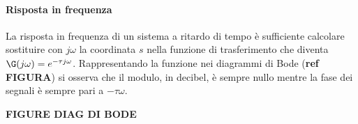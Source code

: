 	\paragraph{Risposta in frequenza} La risposta in frequenza di un sistema a ritardo di tempo è sufficiente calcolare sostituire con $j\omega$ la coordinata $s$ nella funzione di trasferimento che diventa $\G(j\omega) = e^{-\tau j\omega}$. Rappresentando la funzione nei diagrammi di Bode (\textbf{ref FIGURA}) si osserva che il modulo, in decibel, è sempre nullo mentre la fase dei segnali è sempre pari a $-\tau \omega$.
	
	\textbf{FIGURE DIAG DI BODE}
	
	
	
	
	
			
			
			
			
			
			
			
			
			
			
			
			
			
			
			
			
			
			
			
		
		
		
		
		
		
		